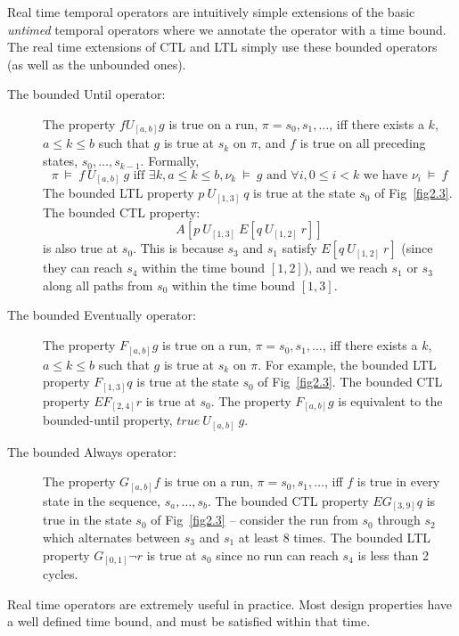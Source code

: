 \noindent
Real time temporal operators 
are intuitively simple extensions of the basic
{\em untimed} temporal operators where we annotate the operator with a time
bound. The real time extensions of CTL and LTL simply use these bounded 
operators (as well as the unbounded ones). 
\begin{description}

\item[The bounded Until operator: ] 
	The property $f U_{[a,b]} g$ is true on
	a run, $\pi = s_0, s_1, \ldots$, iff there exists a $k$, 
	$a \leq k \leq b$ such that $g$ is true at $s_k$ on $\pi$, and $f$
	is true on all preceding states, $s_0, \ldots, s_{k-1}$. Formally,
	\[ \pi\ \models\ f\ U_{[a,b]}\ g \mbox{ iff } \exists k,
	a \leq k \leq b, \nu_k\ \models\ g \mbox{ and } 
	\forall i, 0 \leq i < k \mbox{ we have } \nu_i\ \models\ f \]
	The bounded LTL property $p\ U_{[1,3]}\ q$ is true at the state
	$s_0$ of Fig~\ref{fig2.3}. The bounded CTL property:
	\[ A[ p\ U_{[1,3]}\ E[ q\ U_{[1,2]}\ r]] \]
	is also true at $s_0$. This is because $s_3$ and $s_1$ satisfy
	$E[ q\ U_{[1,2]}\ r]$ (since they can reach $s_4$ within the time
	bound $[1,2]$), and we reach $s_1$ or $s_3$ along all paths from
	$s_0$ within the time bound $[1,3]$.

\item[The bounded Eventually operator: ] The property $F_{[a,b]} g$ is true
	on a run, $\pi = s_0, s_1, \ldots$, iff there exists a $k$,
	$a \leq k \leq b$ such that $g$ is true at $s_k$ on $\pi$.
	For example, the bounded LTL property $F_{[1,3]} q$ is true at the
	state $s_0$ of Fig~\ref{fig2.3}. The bounded CTL property 
	$EF_{[2,4]} r$ is true at $s_0$. The property $F_{[a,b]} g$ is
	equivalent to the bounded-until property, $true\ U_{[a,b]}\ g$. 

\item[The bounded Always operator: ] The property $G_{[a,b]} f$ is true
	on a run, $\pi = s_0, s_1, \ldots$, iff $f$ is true in every
	state in the sequence, $s_a, \ldots, s_b$. The bounded CTL property
	$EG_{[3,9]} q$ is true in the state $s_0$ of Fig~\ref{fig2.3} --
	consider the run from $s_0$ through $s_2$ which alternates between
	$s_3$ and $s_1$ at least 8 times. The bounded LTL property
	$G_{[0,1]} \neg r$ is true at $s_0$ since no run can reach $s_4$
	is less than 2 cycles.

\end{description}
\noindent
Real time operators are extremely useful in practice. Most design properties
have a well defined time bound, and must be satisfied within that time.

